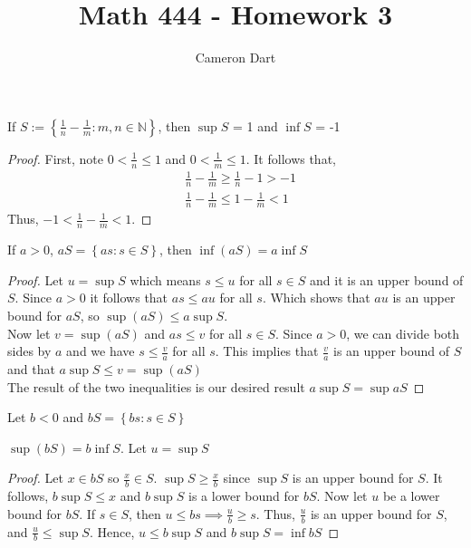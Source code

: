 \documentclass[12pt]{article}
\newcommand{\N}{\mathbb{N}}
\newenvironment{claim}[2][Claim]{\begin{trivlist}
		\item[\hskip \labelsep {\bfseries #1}\hskip \labelsep {\bfseries #2}]}{\end{trivlist}}
\begin{document}
	\title{Math 444 - Homework 3}
	\author{Cameron Dart}
	\maketitle

\begin{claim}{2.4.2}
If $S:= \left \{ \frac{1}{n} - \frac{1}{m} : m,n \in \N \right \}$, then $\sup S$ = 1 and $\inf S$ = -1
\end{claim}
\begin{proof}
	First, note $0 < \frac{1}{n} \leq 1$ and $0 < \frac{1}{m} \leq 1$. 
	It follows that,
	\begin{align*}
		& \frac{1}{n} - \frac{1}{m} \geq \frac{1}{n} - 1 > -1 \\
		& \frac{1}{n} - \frac{1}{m} \leq 1 - \frac{1}{m} < 1
	\end{align*}	
	Thus, $-1 < \frac{1}{n} - \frac{1}{m} < 1$.
\end{proof}

	\begin{claim}{2.4.2a}
		If $a > 0$, $aS = \left \{ as : s \in S \right\}$, then $\inf(aS) = a \inf S$
	\end{claim}
	\begin{proof}
		Let $u = \sup S$ which means $s \leq u$ for all $s \in S$ and it is an upper bound of $S$. Since $a > 0$ it follows that $as \leq au$ for all $s$. Which shows that $au$ is an upper bound for $aS$, so $\sup(aS) \leq a \sup S$. \\ 
		Now let $v = \sup(aS)$ and $as \leq v$ for all $s \in S$. Since $a > 0$, we can divide both sides by $a$ and we have $s \leq \frac{v}{a}$ for all $s$. This implies that $\frac{v}{a}$ is an upper bound of $S$ and that $a \sup S \leq v = \sup(aS)$\\
		The result of the two inequalities is our desired result $a \sup S = \sup aS$ 
		\end{proof}

	\begin{claim}{2.4.4b}
		Let $b < 0$ and $bS = \left \{ bs : s \in S  \right \}$
		\begin{center}
			$\sup(bS) = b \inf S$. Let $u = \sup S$
		\end{center}
	\end{claim}
	\begin{proof}
		Let $x \in bS$ so $\frac{x}{b} \in S$. $\sup S \geq \frac{x}{b}$ since $\sup S$ is an upper bound for $S$. It follows, $b \sup S \leq x$ and $b \sup S$ is a lower bound for $bS$. Now let $u$ be a lower bound for $bS$. If $s \in S$, then $u \leq bs \implies \frac{u}{b} \geq s$. Thus, $\frac{u}{b}$ is an upper bound for $S$, and $\frac{u}{b} \leq \sup S$. Hence, $u \leq b \sup S$ and $b \sup S = \inf bS$   	
		\end{proof}
	
\end{document}
